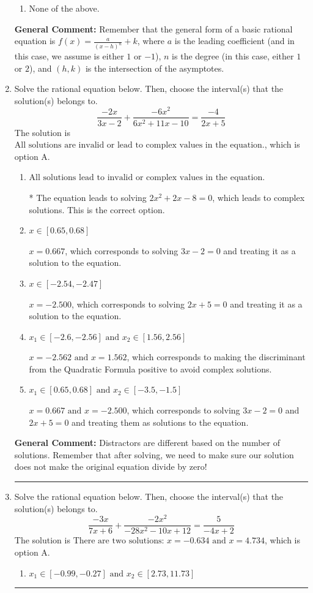 \documentclass{extbook}[14pt]
\newcommand{\litem}[1]{\item #1

\rule{\textwidth}{0.4pt}}
\begin{document}
\begin{enumerate}
{\begin{enumerate}[label=\Alph*.]
\begin{multicols}{2}
\end{multicols}\item None of the above.\end{enumerate}
\textbf{General Comment:} Remember that the general form of a basic rational equation is $ f(x) = \frac{a}{(x-h)^n} + k$, where $a$ is the leading coefficient (and in this case, we assume is either $1$ or $-1$), $n$ is the degree (in this case, either $1$ or $2$), and $(h, k)$ is the intersection of the asymptotes.
}
\litem{
Solve the rational equation below. Then, choose the interval(s) that the solution(s) belongs to.
\[ \frac{-2x}{3x -2} + \frac{-6x^{2}}{6x^{2} +11 x -10} = \frac{-4}{2x + 5} \]The solution is \( \text{All solutions are invalid or lead to complex values in the equation.} \), which is option A.\begin{enumerate}[label=\Alph*.]
\item \( \text{All solutions lead to invalid or complex values in the equation.} \)

* The equation leads to solving $2x^{2} +2 x -8=0$, which leads to complex solutions. This is the correct option.
\item \( x \in [0.65,0.68] \)

$x = 0.667$, which corresponds to solving $3x -2 = 0$ and treating it as a solution to the equation.
\item \( x \in [-2.54,-2.47] \)

$x = -2.500$, which corresponds to solving $2x + 5 = 0$ and treating it as a solution to the equation.
\item \( x_1 \in [-2.6, -2.56] \text{ and } x_2 \in [1.56,2.56] \)

$x = -2.562 \text{ and } x = 1.562$, which corresponds to making the discriminant from the Quadratic Formula positive to avoid complex solutions.
\item \( x_1 \in [0.65, 0.68] \text{ and } x_2 \in [-3.5,-1.5] \)

$x = 0.667 \text{ and } x = -2.500$, which corresponds to solving $3x -2 = 0$ and $2x + 5 = 0$ and treating them as solutions to the equation.
\end{enumerate}

\textbf{General Comment:} Distractors are different based on the number of solutions. Remember that after solving, we need to make sure our solution does not make the original equation divide by zero!
}
\litem{
Solve the rational equation below. Then, choose the interval(s) that the solution(s) belongs to.
\[ \frac{-3x}{7x + 6} + \frac{-2x^{2}}{-28x^{2} -10 x + 12} = \frac{5}{-4x + 2} \]The solution is \( \text{There are two solutions: } x = -0.634 \text{ and } x = 4.734 \), which is option A.\begin{enumerate}[label=\Alph*.]
\item \( x_1 \in [-0.99, -0.27] \text{ and } x_2 \in [2.73,11.73] \)


\end{enumerate}}
\end{enumerate}
\end{document}

